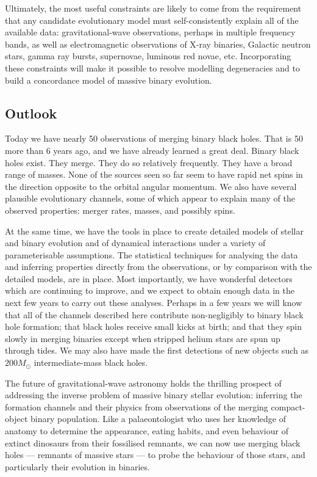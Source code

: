 \documentclass[review]{elsarticle}
\begin{document}
Ultimately, the most useful constraints are likely to come from the requirement that any candidate evolutionary model must self-consistently explain all of the available data: gravitational-wave observations, perhaps in multiple frequency bands, as well as electromagnetic observations of X-ray binaries, Galactic neutron stars, gamma ray bursts, supernovae, luminous red novae, etc. Incorporating these constraints will make it possible to resolve modelling degeneracies and to build a concordance model of massive binary evolution.  

\subsection{Outlook}

Today we have nearly 50 observations of merging binary black holes.  That is 50 more than 6 years ago, and we have already learned a great deal.  Binary black holes exist. They merge. They do so relatively frequently.  They have a broad range of masses. None of the sources seen so far seem to have rapid net spins in the direction opposite to the orbital angular momentum.  We also have several plausible evolutionary channels, some of which appear to explain many of the observed properties: merger rates, masses, and possibly spins. 

At the same time, we have the tools in place to create detailed models of stellar and binary evolution and of dynamical interactions under a variety of parameterisable assumptions.  The statistical techniques for analysing the data and inferring properties directly from the observations, or by comparison with the detailed models, are in place.  Most importantly, we have wonderful detectors which are continuing to improve, and we expect to obtain enough data in the next few years to carry out these analyses.  Perhaps in a few years we will know that all of the channels described here contribute non-negligibly to binary black hole formation; that black holes receive small kicks at birth; and that they spin slowly in merging binaries except when stripped helium stars are spun up through tides. We may also have made the first detections of new objects such as $200 M_\odot$ intermediate-mass black holes.

The future of gravitational-wave astronomy holds the thrilling prospect of addressing the inverse problem of massive binary stellar evolution: inferring the formation channels and their physics from observations of the merging compact-object binary population.  Like a palaeontologist who uses her knowledge of anatomy to determine the appearance, eating habits, and even behaviour of extinct dinosaurs from their fossilised remnants, we can now use merging black holes --- remnants of massive stars --- to probe the behaviour of those stars, and particularly their evolution in binaries.
\end{document}
